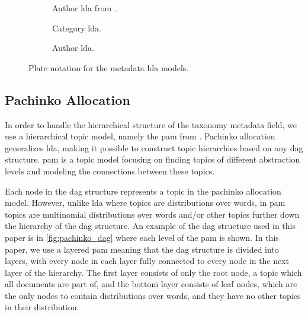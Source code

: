 \begin{figure*}[ht]
	\centering
	\begin{subfigure}{0.275\textwidth}
		\centering
		\resizebox{\textwidth}{!}{%
			
		}
		\caption{Author \gls{lda} from \cite{author_topic_2012}.}
		\label{fig:original_author_lda}
	\end{subfigure}
	\hspace{2em}
	\begin{subfigure}{0.275\textwidth}
		\centering
		\resizebox{\textwidth}{!}{%
		
		}
		\caption{Category \gls{lda}.}
		\label{fig:category_lda}
	\end{subfigure}
	\hspace{2em}
	\begin{subfigure}{0.275\textwidth}
		\centering
		\resizebox{\textwidth}{!}{%
			
		}
		\caption{Author \gls{lda}.}
		\label{fig:author_lda}
	\end{subfigure}	
	\caption{Plate notation for the metadata \gls{lda} models.}
	\label{fig:metadata_lda}
\end{figure*}

\subsection{Pachinko Allocation}
In order to handle the hierarchical structure of the taxonomy metadata field, we use a hierarchical topic model, namely the \acrfull{pam} from \citet{li2006pachinko}.
Pachinko allocation generalizes \gls{lda}, making it possible to construct topic hierarchies based on any \gls{dag} structure.
\gls{pam} is a topic model focusing on finding topics of different abstraction levels and modeling the connections between these topics. 

Each node in the \gls{dag} structure represents a topic in the pachinko allocation model. 
However, unlike \gls{lda} where topics are distributions over words, in \gls{pam} topics are multinomial distributions over words and/or other topics further down the hierarchy of the \gls{dag} structure.
An example of the \gls{dag} structure used in this paper is in \autoref{fig:pachinko_dag} where each level of the \gls{pam} is shown.
In this paper, we use a layered \gls{pam} meaning that the \gls{dag} structure is divided into layers, with every node in each layer fully connected to every node in the next layer of the hierarchy.
The first layer consists of only the root node, a topic which all documents are part of, and the bottom layer consists of leaf nodes, which are the only nodes to contain distributions over words, and they have no other topics in their distribution.

